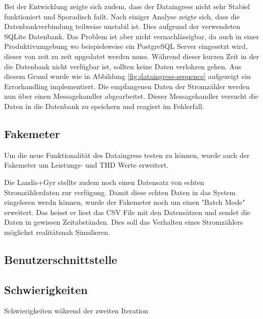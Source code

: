 Bei der Entwicklung zeigte sich zudem, dass der Dataingress nicht sehr Stabiel
funktioniert und Sporadisch failt. Nach einiger Analyse zeigte sich, dass
die Datenbankverbindung teilweise unstabil ist. Dies aufgrund der verwendeten
SQLite Datenbank. Das Problem ist aber nicht vernachlässigbar, da auch in einer
Produktivumgebung wo beispielsweise ein PostgreSQL Server eingesetzt wird,
dieser von zeit zu zeit upgedatet werden muss.
Während dieser kurzen Zeit in der die Datenbank nicht verfügbar ist, sollten keine
Daten verlohren gehen.
Aus diesem Grund wurde wie in Abbildung \ref{fig:dataingress-sequence} aufgezeigt
ein Errorhandling implementiert. Die empfangenen Daten der Stromzähler
werden nun über einen Messagehandler abgearbeitet.
Dieser Messagehandler versucht die Daten in die Datenbank zu speichern und
reagiert im Fehlerfall.

\subsection{Fakemeter}

Um die neue Funktionalität des Dataingress testen zu können, wurde auch der
Fakemeter um Leistungs- und THD Werte erweitert.

Die Landis+Gyr stellte zudem noch einen Datensatz von echten Stromzählerdaten
zur verfügung. Damit diese echten Daten in das System eingelesen werdn können,
wurde der Fakemeter noch um einen "Batch Mode" erweitert. Das heisst
er liest das CSV File mit den Datensätzen und sendet die Daten in
gewissen Zeitabständen. Dies soll das Verhalten eines Stromzählers
möglichst realitätsnah Simulieren.

\subsection{Benutzerschnittstelle}

\subsection{Schwierigkeiten}
Schwierigkeiten während der zweiten Iteration
